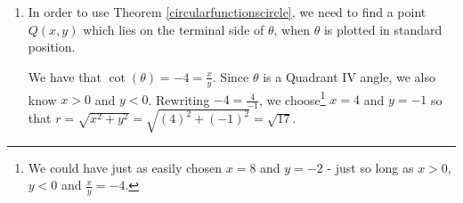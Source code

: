 \documentclass{ximera}
\begin{document}
\begin{example}
\begin{explanation}
\begin{enumerate}
\begin{image}
\end{image}

\item In order to use Theorem \ref{circularfunctionscircle}, we need to find a point $Q(x,y)$ which lies on the terminal side of $\theta$, when $\theta$ is plotted in standard position.  




We have that $\cot(\theta) = -4 =  \frac{x}{y}$.  Since  $\theta$ is a Quadrant IV angle, we also know $x>0$ and $y< 0$.  Rewriting   $-4 = \frac{4}{-1}$, we choose\footnote{We could have just as easily chosen $x=8$ and $y=-2$ - just so long as $x>0$, $y<0$ and $\frac{x}{y} = -4$.}   $x = 4$ and $y = -1$ so that $r = \sqrt{x^2+y^2} = \sqrt{(4)^2 + (-1)^2} = \sqrt{17}$.  




\end{enumerate}
\end{explanation}
\end{example}
\end{document}
